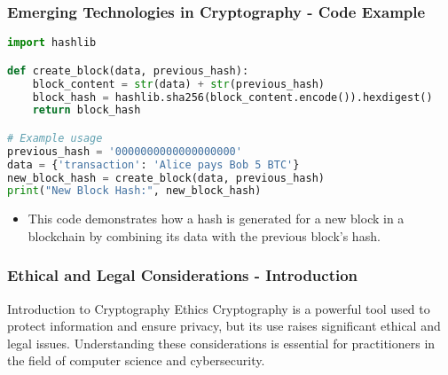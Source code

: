 \documentclass{beamer}
\begin{document}
\begin{frame}[fragile]
    \frametitle{Emerging Technologies in Cryptography - Code Example}

    \begin{lstlisting}[language=Python]
import hashlib

def create_block(data, previous_hash):
    block_content = str(data) + str(previous_hash)
    block_hash = hashlib.sha256(block_content.encode()).hexdigest()
    return block_hash

# Example usage
previous_hash = '0000000000000000000'
data = {'transaction': 'Alice pays Bob 5 BTC'}
new_block_hash = create_block(data, previous_hash)
print("New Block Hash:", new_block_hash)
    \end{lstlisting}
    
    \begin{itemize}
        \item This code demonstrates how a hash is generated for a new block in a blockchain by combining its data with the previous block's hash.
    \end{itemize}
\end{frame}

\begin{frame}[fragile]
    \frametitle{Ethical and Legal Considerations - Introduction}
    \begin{block}{Introduction to Cryptography Ethics}
        Cryptography is a powerful tool used to protect information and ensure privacy, but its use raises significant ethical and legal issues. Understanding these considerations is essential for practitioners in the field of computer science and cybersecurity.
    \end{block}
\end{frame}
\end{document}
